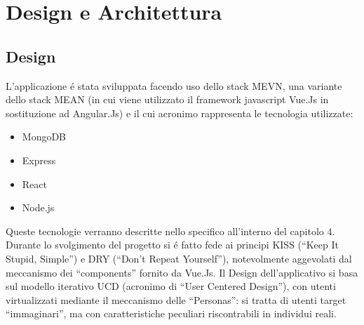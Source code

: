 \documentclass{report}
\begin{document}
\newpage

\section{Design e Architettura}
\subsection{Design}
L’applicazione é stata sviluppata facendo uso dello stack MEVN, una variante dello stack MEAN (in cui viene utilizzato il framework javascript Vue.Js in sostituzione ad Angular.Js) e il cui acronimo rappresenta le tecnologia utilizzate:
\begin{itemize}
    \item 	MongoDB
    \item 	Express
    \item	React
    \item 	Node.js
\end{itemize}
Queste tecnologie verranno descritte nello specifico all’interno del capitolo 4.
\newline \newline
Durante lo svolgimento del progetto si é fatto fede ai principi KISS (“Keep It Stupid, Simple”) e DRY (“Don’t Repeat Yourself”), notevolmente aggevolati dal meccanismo dei “components” fornito da Vue.Js.
\newline \newline
Il Design dell’applicativo si basa sul modello iterativo UCD (acronimo di “User Centered Design”), con utenti virtualizzati mediante il meccanismo delle “Personas”: si tratta di utenti target “immaginari”, ma con caratteristiche peculiari riscontrabili in individui reali.
\end{document}
